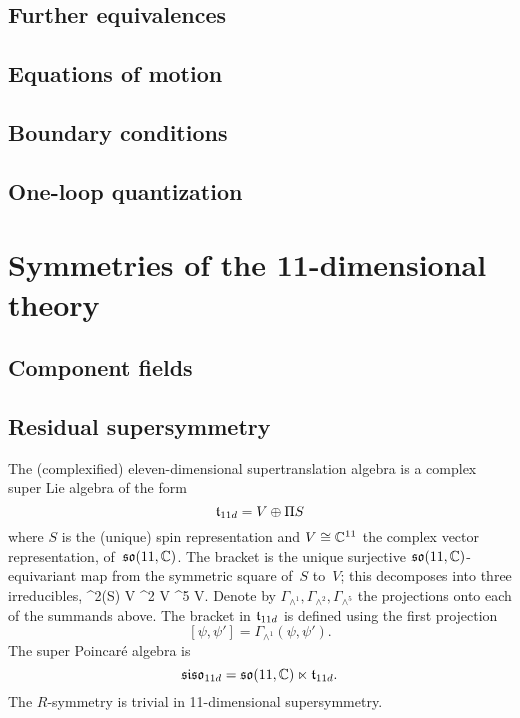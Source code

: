\documentclass[11pt]{amsart}
\begin{document}
\subsection{Further equivalences}

\subsection{Equations of motion}


\subsection{Boundary conditions}


\subsection{One-loop quantization} 



\section{Symmetries of the 11-dimensional theory}

\subsection{Component fields}


\subsection{Residual supersymmetry} 



The (complexified) eleven-dimensional supertranslation algebra is a complex super Lie algebra of the form
\[
  \mathfrak t_{11d} = V \oplus \Pi S
\]
where $S$ is the (unique) spin representation and $V \cong \mathbb C^{11}$ the complex vector representation, of~$\mathfrak{so}(11, \mathbb C)$. 
The bracket is the unique surjective $\mathfrak{so}(11,\mathbb C)$-equivariant map from the symmetric square of~$S$ to~$V$;
this decomposes into three irreducibles, 
\beqn\label{eqn:decomp}
  \Sym^2(S) \cong V \oplus \wedge^2 V \oplus \wedge^5 V.
\eeqn
Denote by $\Gamma_{\wedge^1}, \Gamma_{\wedge^2}, \Gamma_{\wedge^5}$ the projections onto each of the summands above. 
The bracket in $\mathfrak t_{11d}$ is defined using the first projection
\[
[\psi, \psi'] = \Gamma_{\wedge^1} (\psi, \psi') .
\]
The super Poincar\'{e} algebra is
\[
  \mathfrak{siso}_{11d} = \mathfrak{so}(11 , \mathbb C) \ltimes \mathfrak t_{11d} .
\]
The $R$-symmetry is trivial in 11-dimensional supersymmetry. 
\end{document}
